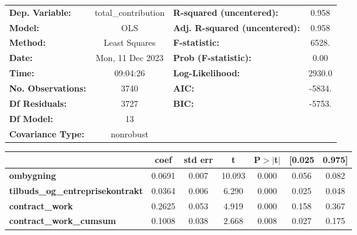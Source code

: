 \begin{center}
\begin{tabular}{lclc}
\toprule
\textbf{Dep. Variable:}                   & total\_contribution & \textbf{  R-squared (uncentered):}      &     0.958   \\
\textbf{Model:}                           &         OLS         & \textbf{  Adj. R-squared (uncentered):} &     0.958   \\
\textbf{Method:}                          &    Least Squares    & \textbf{  F-statistic:       }          &     6528.   \\
\textbf{Date:}                            &   Mon, 11 Dec 2023  & \textbf{  Prob (F-statistic):}          &     0.00    \\
\textbf{Time:}                            &       09:04:26      & \textbf{  Log-Likelihood:    }          &    2930.0   \\
\textbf{No. Observations:}                &          3740       & \textbf{  AIC:               }          &    -5834.   \\
\textbf{Df Residuals:}                    &          3727       & \textbf{  BIC:               }          &    -5753.   \\
\textbf{Df Model:}                        &            13       & \textbf{                     }          &             \\
\textbf{Covariance Type:}                 &      nonrobust      & \textbf{                     }          &             \\
\bottomrule
\end{tabular}
\begin{tabular}{lcccccc}
                                          & \textbf{coef} & \textbf{std err} & \textbf{t} & \textbf{P$> |$t$|$} & \textbf{[0.025} & \textbf{0.975]}  \\
\midrule
\textbf{ombygning}                        &       0.0691  &        0.007     &    10.093  &         0.000        &        0.056    &        0.082     \\
\textbf{tilbuds\_og\_entreprisekontrakt}  &       0.0364  &        0.006     &     6.290  &         0.000        &        0.025    &        0.048     \\
\textbf{contract\_work}                   &       0.2625  &        0.053     &     4.919  &         0.000        &        0.158    &        0.367     \\
\textbf{contract\_work\_cumsum}           &       0.1008  &        0.038     &     2.668  &         0.008        &        0.027    &        0.175     \\

\end{tabular}
\end{center}
